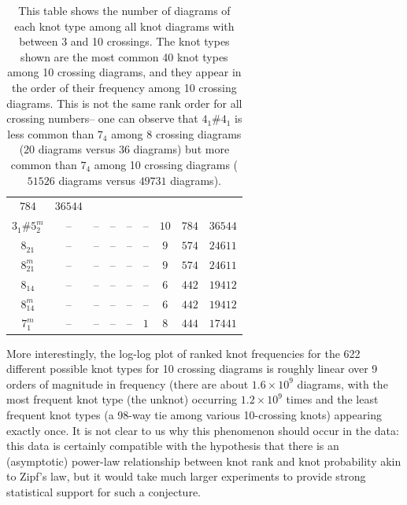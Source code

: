 \documentclass[amsmath,secnumarabic,floatfix,amssymb,nofootinbib,nobibnotes,letterpaper,11pt,tightenlines,showkeys]{revtex4}
\theoremstyle{definition}
\let\mgp=\marginpar \marginparwidth18mm \marginparsep1mm
\def\marginpar#1{\mgp{\raggedright\tiny #1}}
\let\lbl=\label
\def\label#1{\lbl{#1}\ifinner\else\marginpar{\ref{#1} #1}\ignorespaces\fi}
\begin{document}
\begin{table}[tp]
\begin{ruledtabular}
\begin{tabular}{ccccccccc}
$\num{784}$ &
$\num{36544}$\\
$3_{1}^{}\#5_{2}^{m}$ &
-- &
-- &
-- &
-- &
-- &
$\num{10}$ &
$\num{784}$ &
$\num{36544}$\\
$8_{21}^{}$ &
-- &
-- &
-- &
-- &
-- &
$\num{9}$ &
$\num{574}$ &
$\num{24611}$\\
$8_{21}^{m}$ &
-- &
-- &
-- &
-- &
-- &
$\num{9}$ &
$\num{574}$ &
$\num{24611}$\\
$8_{14}^{}$ &
-- &
-- &
-- &
-- &
-- &
$\num{6}$ &
$\num{442}$ &
$\num{19412}$\\
$8_{14}^{m}$ &
-- &
-- &
-- &
-- &
-- &
$\num{6}$ &
$\num{442}$ &
$\num{19412}$\\
$7_{1}^{m}$ &
-- &
-- &
-- &
-- &
$\num{1}$ &
$\num{8}$ &
$\num{444}$ &
$\num{17441}$
\end{tabular}
\end{ruledtabular}
\caption{This table shows the number of diagrams of each knot type among all knot diagrams with between 3 and 10 crossings. The knot types shown are the most common 40 knot types among 10 crossing diagrams, and they appear in the order of their frequency among 10 crossing diagrams. This is not the same rank order for all crossing numbers-- one can observe that $4_1 \# 4_1$ is less common than $7_4$ among 8 crossing diagrams ($\num{20}$ diagrams versus $\num{36}$ diagrams) but more common than $7_4$ among 10 crossing diagrams ($\num{51526}$ diagrams versus $\num{49731}$ diagrams).}
\label{tab:knot frequency raw data}
\end{table}


More interestingly, the log-log plot of ranked knot frequencies for the 622 different possible knot types for 10 crossing diagrams is roughly linear over 9 orders of magnitude in frequency (there are about $1.6 \times 10^9$ diagrams, with the most frequent knot type (the unknot) occurring $1.2 \times 10^9$ times and the least frequent knot types (a 98-way tie among various 10-crossing knots) appearing exactly once. It is not clear to us why this phenomenon should occur in the data: this data is certainly compatible with the hypothesis that there is an (asymptotic) power-law relationship between knot rank and knot probability akin to Zipf's law, but it would take much larger experiments to provide strong statistical support for such a conjecture.
\end{document}
